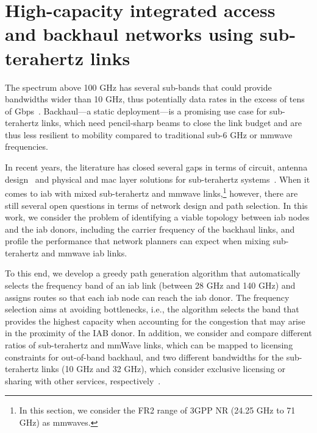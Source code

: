 


\section{High-capacity integrated access and backhaul networks using sub-terahertz links}
\label{sec:iab-wons}

The spectrum above 100 GHz has several sub-bands that could provide bandwidths wider than 10 GHz, thus potentially data rates in the excess of tens of Gbps~\cite{akyildiz2014terahertz}. Backhaul---a static deployment---is a promising use case for sub-terahertz links, which need pencil-sharp beams to close the link budget and are thus less resilient to mobility compared to traditional sub-6 GHz or \gls{mmwave} frequencies. 

In recent years, the literature has closed several gaps in terms of circuit, antenna design~\cite{singh2020design} and physical and \gls{mac} layer solutions for sub-terahertz systems~\cite{ghafoor2020mac}.
%
When it comes to \gls{iab} with mixed sub-terahertz and \gls{mmwave} links,\footnote{In this section, we consider the FR2 range of 3GPP NR (24.25 GHz to 71 GHz) as \glspl{mmwave}.} however, there are still several open questions in terms of network design and path selection. In this work, we consider the problem of identifying a viable topology between \gls{iab} nodes and the \gls{iab} donors, including the carrier frequency of the backhaul links, and profile the performance that network planners can expect when mixing sub-terahertz and \gls{mmwave} \gls{iab} links.

To this end, 
%
we develop a greedy path generation algorithm that automatically selects the frequency band of an \gls{iab} link (between 28 GHz and 140 GHz) and assigns routes so that each \gls{iab} node can reach the \gls{iab} donor. The frequency selection aims at avoiding bottlenecks, i.e., the algorithm selects the band that provides the highest capacity when accounting for the congestion that may arise in the proximity of the IAB donor. In addition, we consider and compare different ratios of sub-terahertz and mmWave links, which can be mapped to licensing constraints for out-of-band backhaul, and two different bandwidths for the sub-terahertz links (10 GHz and 32 GHz), which consider exclusive licensing or sharing with other services, respectively~\cite{polese2022dynamic}.

